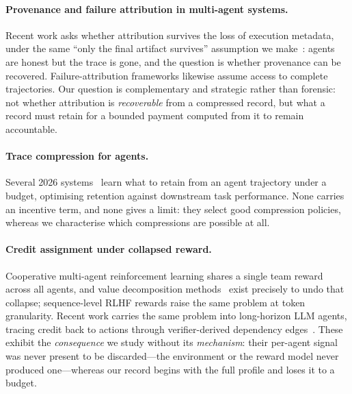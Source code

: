 \paragraph{Provenance and failure attribution in multi-agent systems.}
Recent work asks whether attribution survives the loss of execution metadata,
under the same ``only the final artifact survives'' assumption we
make~\cite{finaltextsurvives}: agents
are honest but the trace is gone, and the question is whether provenance can be
recovered. Failure-attribution frameworks likewise assume access to complete
trajectories. Our question is complementary and strategic rather than forensic:
not whether attribution is \emph{recoverable} from a compressed record, but what
a record must retain for a bounded payment computed from it to remain
accountable.

\paragraph{Trace compression for agents.}
Several 2026 systems~\cite{trace2026,tracer2026} learn what to retain
from an agent trajectory under a budget, optimising retention against
downstream task performance. None carries an
incentive term, and none gives a limit: they select good compression policies,
whereas we characterise which compressions are possible at all.

\paragraph{Credit assignment under collapsed reward.}
Cooperative multi-agent reinforcement learning shares a single team reward across
all agents, and value decomposition methods~\cite{qmix,coma,vdn} exist
precisely to undo that collapse; sequence-level RLHF rewards raise the same
problem at token
granularity. Recent work carries the same problem into long-horizon LLM agents, tracing
credit back to actions through verifier-derived dependency
edges~\cite{vict2026}. These exhibit the \emph{consequence} we study without its
\emph{mechanism}: their per-agent signal was never present to be discarded---the
environment or the reward model never produced one---whereas our record begins
with the full profile and loses it to a budget.
